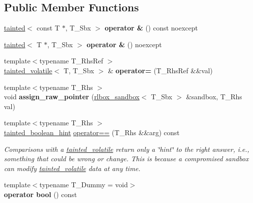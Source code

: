 \subsection*{Public Member Functions}
\begin{DoxyCompactItemize}
\item 
\mbox{\label{classrlbox_1_1tainted__volatile_a6cfb61db0c20522d8f9f33d111ae4d5c}} 
\hyperlink{classrlbox_1_1tainted}{tainted}$<$ const T $\ast$, T\+\_\+\+Sbx $>$ {\bfseries operator \&} () const noexcept
\item 
\mbox{\label{classrlbox_1_1tainted__volatile_ace5c231dd34dd457c5780711f659a262}} 
\hyperlink{classrlbox_1_1tainted}{tainted}$<$ T $\ast$, T\+\_\+\+Sbx $>$ {\bfseries operator \&} () noexcept
\item 
\mbox{\label{classrlbox_1_1tainted__volatile_a03de23a9e3db2a7ec1c392544c704988}} 
{\footnotesize template$<$typename T\+\_\+\+Rhs\+Ref $>$ }\\\hyperlink{classrlbox_1_1tainted__volatile}{tainted\+\_\+volatile}$<$ T, T\+\_\+\+Sbx $>$ \& {\bfseries operator=} (T\+\_\+\+Rhs\+Ref \&\&val)
\item 
\mbox{\label{classrlbox_1_1tainted__volatile_adc112be01be78aff6187e845e2e3ee5f}} 
{\footnotesize template$<$typename T\+\_\+\+Rhs $>$ }\\void {\bfseries assign\+\_\+raw\+\_\+pointer} (\hyperlink{classrlbox_1_1rlbox__sandbox}{rlbox\+\_\+sandbox}$<$ T\+\_\+\+Sbx $>$ \&sandbox, T\+\_\+\+Rhs val)
\item 
\mbox{\label{classrlbox_1_1tainted__volatile_a7edbf4fa582a5cedd158b9fe3d1d69b5}} 
{\footnotesize template$<$typename T\+\_\+\+Rhs $>$ }\\\hyperlink{classrlbox_1_1tainted__boolean__hint}{tainted\+\_\+boolean\+\_\+hint} \hyperlink{classrlbox_1_1tainted__volatile_a7edbf4fa582a5cedd158b9fe3d1d69b5}{operator==} (T\+\_\+\+Rhs \&\&arg) const
\begin{DoxyCompactList}\small\item\em Comparisons with a \hyperlink{classrlbox_1_1tainted__volatile}{tainted\+\_\+volatile} return only a \char`\"{}hint\char`\"{} to the right answer, i.\+e., something that could be wrong or change. This is because a compromised sandbox can modify \hyperlink{classrlbox_1_1tainted__volatile}{tainted\+\_\+volatile} data at any time. \end{DoxyCompactList}\item 
\mbox{\label{classrlbox_1_1tainted__volatile_ad6b318608ffa3306c230b8043b33091d}} 
{\footnotesize template$<$typename T\+\_\+\+Dummy  = void$>$ }\\{\bfseries operator bool} () const
\end{DoxyCompactItemize}
